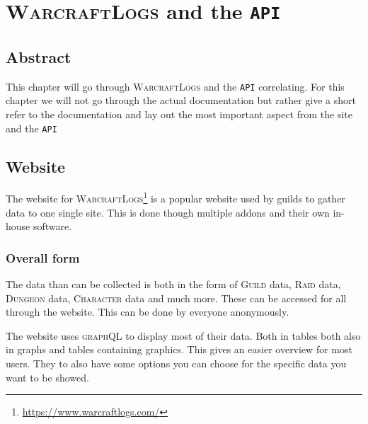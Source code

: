 \documentclass[10pt, a4paper]{memoir}
\numberwithin{equation}{section}
\theoremstyle{plain}
\theoremstyle{defp}
\theoremstyle{dotless}
\theoremstyle{definition}
\theoremstyle{dotless}
\theoremstyle{dotless}
\theoremstyle{defp}
\theoremstyle{defp}
\theoremstyle{be}          %
\theoremstyle{defp}
\newcommand\ttt[1]{\texttt{#1}}
\begin{document}
\tableofcontents

\newpage

\raggedright

\pagestyle{fancy}
\renewcommand{\sectionmark}[1]{\markboth{#1}{}}

\fancyhf{}
\rhead{\fancyplain{}{$ $\leftmark $ $}} %
\lhead{\fancyplain{}{$ $\mytitle$ $}} %
\cfoot{\fancyplain{}{\thepage}}


\chapter{\textsc{WarcraftLogs} and the \ttt{API}}

\section*{Abstract}

This chapter will go through \textsc{WarcraftLogs} and the \ttt{API} correlating. For this chapter we will not go through the actual documentation but rather give a short refer to the documentation and lay out the most important aspect from the site and the \ttt{API}

\section{Website}

The website for \textsc{WarcraftLogs}\footnote{\url{https://www.warcraftlogs.com/}} is a popular website used by guilds to gather data to one single site. This is done though multiple addons and their own in-house software. 

\subsection{Overall form}

The data than can be collected is both in the form of \textsc{Guild} data, \textsc{Raid} data, \textsc{Dungeon} data, \textsc{Character} data and much more. These can be accessed for all through the website. This can be done by everyone anonymously.

\medskip

The website uses \textsc{graphQL} to display most of their data. Both in tables both also in graphs and tables containing graphics. This gives an easier overview for most users. They to also have some options you can choose for the specific data you want to be showed. 
\end{document}
